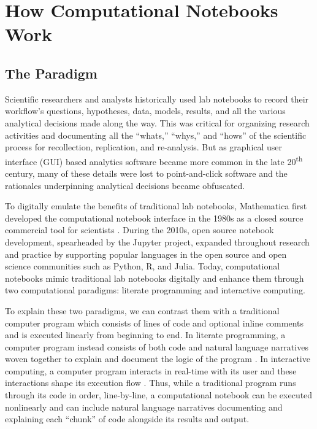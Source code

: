 \documentclass[11pt,letterpaper]{article}
\begin{document}
\section{How Computational Notebooks Work}

\subsection{The Paradigm}

Scientific researchers and analysts historically used lab notebooks to record their workflow's questions, hypotheses, data, models, results, and all the various analytical decisions made along the way. This was critical for organizing research activities and documenting all the \enquote{whats,} \enquote{whys,} and \enquote{hows} of the scientific process for recollection, replication, and re-analysis. But as graphical user interface (GUI) based analytics software became more common in the late 20\textsuperscript{th} century, many of these details were lost to point-and-click software and the rationales underpinning analytical decisions became obfuscated.

To digitally emulate the benefits of traditional lab notebooks, Mathematica first developed the computational notebook interface in the 1980s as a closed source commercial tool for scientists \citep{somers_scientific_2018}. During the 2010s, open source notebook development, spearheaded by the Jupyter project, expanded throughout research and practice by supporting popular languages in the open source and open science communities such as Python, R, and Julia. Today, computational notebooks mimic traditional lab notebooks digitally and enhance them through two computational paradigms: literate programming and interactive computing.

To explain these two paradigms, we can contrast them with a traditional computer program which consists of lines of code and optional inline comments and is executed linearly from beginning to end. In literate programming, a computer program instead consists of both code and natural language narratives woven together to explain and document the logic of the program \citep{knuth_literate_1992}. In interactive computing, a computer program interacts in real-time with its user and these interactions shape its execution flow \citep{perez_ipython:_2007}. Thus, while a traditional program runs through its code in order, line-by-line, a computational notebook can be executed nonlinearly and can include natural language narratives documenting and explaining each \enquote{chunk} of code alongside its results and output.
\end{document}

